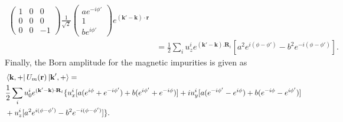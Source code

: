 \documentclass[aps,prb,amsmath,amssymb,footinbib,showpacs,twocolumn]{revtex4-2}
\begin{document}
\begin{widetext}
\begin{align}
\begin{pmatrix}
1 & 0 & 0\\
0 & 0 & 0\\
0 & 0 & -1
\end{pmatrix}\frac{1}{\sqrt{2}} \begin{pmatrix}
              ae^{-i\phi'}  \\
              1 \\
               be^{i\phi'}
            \end{pmatrix}e^{(\mathbf{k'-k})\cdot\mathbf{r}}
            \nonumber\\
            &= \frac{1}{2}\sum_{i}u^{i}_{z}e^{(\mathbf{k'-k}).\mathbf{R}_{i}}\left[a^{2}e^{i(\phi-\phi')}-b^{2}e^{-i(\phi-\phi')}\right].
\end{align}
Finally, the Born amplitude for the magnetic impurities is given as
\begin{align}
     &\bra{\textbf{k},+} U_{m}(\textbf{r})\ket{\textbf{k}',+} = \nonumber\\ &\frac{1}{2}\sum_{i}u^{i}_{0}e^{(\textbf{k}'-\textbf{k})\cdot\textbf{R}_{i}}
    \{u^{i}_{x}[a(e^{i\phi}+e^{-i\phi'})+b(e^{i\phi'}+e^{-i\phi})]
    + iu^{i}_{y}[a(e^{-i\phi'}-e^{i\phi})+b(e^{-i\phi}-e^{i\phi'})] \nonumber\\ &
    +u^{i}_{z}[a^{2}e^{i(\phi-\phi')}- b^{2}e^{-i(\phi-\phi')}]\}.
\end{align}

\end{widetext}
\end{document}
